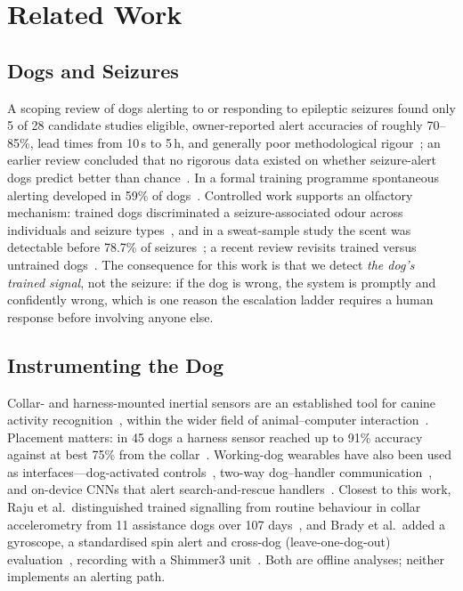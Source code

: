 \section{Related Work}
\label{sec:related}

\subsection{Dogs and Seizures}
A scoping review of dogs alerting to or responding to epileptic seizures found only 5 of 28 candidate studies eligible, owner-reported alert accuracies of roughly 70--85\%, lead times from 10\,s to 5\,h, and generally poor methodological rigour~\cite{catala2018scoping}; an earlier review concluded that no rigorous data existed on whether seizure-alert dogs predict better than chance~\cite{brown2011sad}. In a formal training programme spontaneous alerting developed in 59\% of dogs~\cite{kirton2008srd}. Controlled work supports an olfactory mechanism: trained dogs discriminated a seizure-associated odour across individuals and seizure types~\cite{catala2019odour}, and in a sweat-sample study the scent was detectable before 78.7\% of seizures~\cite{maa2021voc}; a recent review revisits trained versus untrained dogs~\cite{luff2024dogs}. The consequence for this work is that we detect \emph{the dog's trained signal}, not the seizure: if the dog is wrong, the system is promptly and confidently wrong, which is one reason the escalation ladder requires a human response before involving anyone else.

\subsection{Instrumenting the Dog}
Collar- and harness-mounted inertial sensors are an established tool for canine activity recognition~\cite{ladha2013dogslife,kumpulainen2018collar,chambers2021deep,hussain2022lstm}, within the wider field of animal--computer interaction~\cite{mancini2011aci}. Placement matters: in 45 dogs a harness sensor reached up to 91\% accuracy against at best 75\% from the collar~\cite{kumpulainen2021harness}. Working-dog wearables have also been used as interfaces---dog-activated controls~\cite{jackson2013fido}, two-way dog--handler communication~\cite{byrne2014twoway}, and on-device CNNs that alert search-and-rescue handlers~\cite{kasnesis2022sar}. Closest to this work, Raju et al.\ distinguished trained signalling from routine behaviour in collar accelerometry from 11 assistance dogs over 107 days~\cite{raju2023signalling}, and Brady et al.\ added a gyroscope, a standardised spin alert and cross-dog (leave-one-dog-out) evaluation~\cite{brady2025collar}, recording with a Shimmer3 unit~\cite{burns2010shimmer}. Both are offline analyses; neither implements an alerting path.

